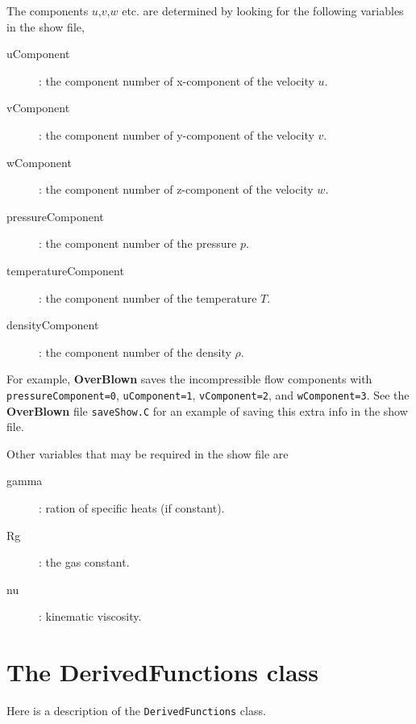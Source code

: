 \documentclass{article}
\begin{document}
\vspace{\baselineskip}
The components $u$,$v$,$w$ etc. are determined by looking for the following variables in the show file,
\begin{description}
 \item[uComponent] : the component number of x-component of the velocity $u$.
 \item[vComponent] : the component number of y-component of the velocity $v$.
 \item[wComponent] : the component number of z-component of the velocity $w$.
 \item[pressureComponent] : the component number of the pressure $p$.
 \item[temperatureComponent] : the component number of the temperature $T$.
 \item[densityComponent] : the component number of the density $\rho$.
\end{description}
For example, {\bf OverBlown} saves the incompressible flow components with {\tt pressureComponent=0},
{\tt uComponent=1}, {\tt vComponent=2}, and {\tt wComponent=3}. See the {\bf OverBlown} file {\tt saveShow.C}
for an example of saving this extra info in the show file.

Other variables that may be required in the show file are
\begin{description}
 \item[gamma] : ration of specific heats (if constant).
 \item[Rg] : the gas constant.
 \item[nu] : kinematic viscosity.
\end{description}


\section{The DerivedFunctions class}

Here is a description of the {\tt DerivedFunctions} class.



\vfill\eject




\printindex
\end{document}
